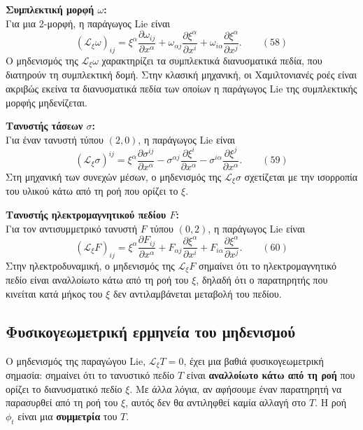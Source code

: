 \documentclass[12pt]{article}
\begin{document}
\textbf{Συμπλεκτική μορφή $\omega$:}\\
Για μια 2-μορφή, η παράγωγος Lie είναι
\begin{equation}
(\mathcal{L}_\xi \omega)_{ij} = \xi^\alpha \frac{\partial \omega_{ij}}{\partial x^\alpha} + \omega_{\alpha j} \frac{\partial \xi^\alpha}{\partial x^i} + \omega_{i\alpha} \frac{\partial \xi^\alpha}{\partial x^j}. \qquad (58)
\end{equation}
Ο μηδενισμός της $\mathcal{L}_\xi \omega$ χαρακτηρίζει τα συμπλεκτικά διανυσματικά πεδία, που διατηρούν τη συμπλεκτική δομή. Στην κλασική μηχανική, οι Χαμιλτονιανές ροές είναι ακριβώς εκείνα τα διανυσματικά πεδία των οποίων η παράγωγος Lie της συμπλεκτικής μορφής μηδενίζεται.

\textbf{Τανυστής τάσεων $\sigma$:}\\
Για έναν τανυστή τύπου $(2,0)$, η παράγωγος Lie είναι
\begin{equation}
(\mathcal{L}_\xi \sigma)^{ij} = \xi^\alpha \frac{\partial \sigma^{ij}}{\partial x^\alpha} - \sigma^{\alpha j} \frac{\partial \xi^i}{\partial x^\alpha} - \sigma^{i\alpha} \frac{\partial \xi^j}{\partial x^\alpha}. \qquad (59)
\end{equation}
Στη μηχανική των συνεχών μέσων, ο μηδενισμός της $\mathcal{L}_\xi \sigma$ σχετίζεται με την ισορροπία του υλικού κάτω από τη ροή που ορίζει το $\xi$.

\textbf{Τανυστής ηλεκτρομαγνητικού πεδίου $F$:}\\
Για τον αντισυμμετρικό τανυστή $F$ τύπου $(0,2)$, η παράγωγος Lie είναι
\begin{equation}
(\mathcal{L}_\xi F)_{ij} = \xi^\alpha \frac{\partial F_{ij}}{\partial x^\alpha} + F_{\alpha j} \frac{\partial \xi^\alpha}{\partial x^i} + F_{i\alpha} \frac{\partial \xi^\alpha}{\partial x^j}. \qquad (60)
\end{equation}
Στην ηλεκτροδυναμική, ο μηδενισμός της $\mathcal{L}_\xi F$ σημαίνει ότι το ηλεκτρομαγνητικό πεδίο είναι αναλλοίωτο κάτω από τη ροή του $\xi$, δηλαδή ότι ο παρατηρητής που κινείται κατά μήκος του $\xi$ δεν αντιλαμβάνεται μεταβολή του πεδίου.

\subsection{Φυσικογεωμετρική ερμηνεία του μηδενισμού}

Ο μηδενισμός της παραγώγου Lie, $\mathcal{L}_\xi T = 0$, έχει μια βαθιά φυσικογεωμετρική σημασία: σημαίνει ότι το τανυστικό πεδίο $T$ είναι \textbf{αναλλοίωτο κάτω από τη ροή} που ορίζει το διανυσματικό πεδίο $\xi$. Με άλλα λόγια, αν αφήσουμε έναν παρατηρητή να παρασυρθεί από τη ροή του $\xi$, αυτός δεν θα αντιληφθεί καμία αλλαγή στο $T$. Η ροή $\phi_t$ είναι μια \textbf{συμμετρία} του $T$.
\end{document}
